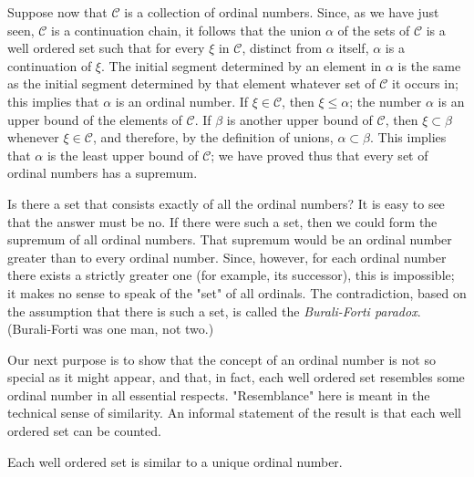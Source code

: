 Suppose now that $\mathcal{C}$ is a collection of ordinal numbers. Since, as we have just seen, $\mathcal{C}$ is a continuation chain, it follows that the union $\alpha$ of the sets of $\mathcal{C}$ is a well ordered set such that for every $\xi$ in $\mathcal{C}$, distinct from $\alpha$ itself, $\alpha$ is a continuation of $\xi$. The initial segment determined by an element in $\alpha$ is the same as the initial segment determined by that element whatever set of $\mathcal{C}$ it occurs in; this implies that $\alpha$ is an ordinal number. If $\xi \in \mathcal{C}$, then $\xi \le \alpha$; the number $\alpha$ is an upper bound of the elements of $\mathcal{C}$. If $\beta$ is another upper bound of $\mathcal{C}$, then $\xi \subset \beta$ whenever $\xi \in \mathcal{C}$, and therefore, by the definition of unions, $\alpha \subset \beta$. This implies that $\alpha$ is the least upper bound of $\mathcal{C}$; we have proved thus that every set of ordinal numbers has a supremum. 

Is there a set that consists exactly of all the ordinal numbers? It is easy to see that the answer must be no. If there were such a set, then we could form the supremum of all ordinal numbers. That supremum would be an ordinal number greater than to every ordinal number. Since, however, for each  ordinal number there exists a strictly greater one (for example, its successor), this is impossible; it makes no sense to speak of the "set" of all ordinals. The contradiction, based on the assumption that there is such a set, is called the \textit{Burali-Forti paradox}. (Burali-Forti was one man, not two.) 

Our next purpose is to show that the concept of an ordinal number is not so special as it might appear, and that, in fact, each well ordered set resembles some ordinal number in all essential respects. "Resemblance" here is meant in the technical sense of similarity. An informal statement of the result is that each well ordered set can be counted. 

\begin{named} Each well ordered set is similar to a unique ordinal number.
\end{named}

